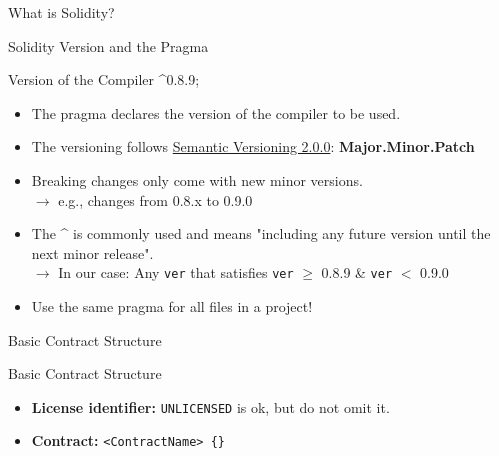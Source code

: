 \documentclass[handout]{beamer}
\begin{document}
\begin{frame}{What is Solidity?}
\vspace{1em}
	

\end{frame}


\begin{frame}{Solidity Version and the Pragma}

\begin{samplecode}{Version of the Compiler}
	 \^{}0.8.9;	
\end{samplecode}


\vspace{1em}

	\begin{itemize}
		\item<1-> The pragma declares the version of the compiler to be used.
 		\item<2-> The versioning follows \link \href{https://semver.org/}{Semantic Versioning 2.0.0}: \textbf{Major.Minor.Patch}
 		\item<3-> Breaking changes only come with new minor versions. \\ {\small $\rightarrow$ e.g., changes from 0.8.x to 0.9.0}
		\item<4-> The \textbf{\^{}} is commonly used and means "including any future version until the next minor release". \\ %
 {$\rightarrow$ \small In our case: Any \texttt{ver} that satisfies \texttt{ver} $\geq$ 0.8.9 \& \texttt{ver} $<$ 0.9.0}
 		\item<5-> Use the same pragma for all files in a project!
	\end{itemize}
	
\end{frame}


\begin{frame}{Basic Contract Structure}

	\begin{samplecode}{Basic Contract Structure}
		
	\end{samplecode}
	\vspace{1em}
	\begin{itemize}
		\item \textbf{License identifier:} \texttt{UNLICENSED} is ok, but do not omit it.
		\item \textbf{Contract:} \texttt{<ContractName> \{\}}
	\end{itemize}

\end{frame}
\end{document}
